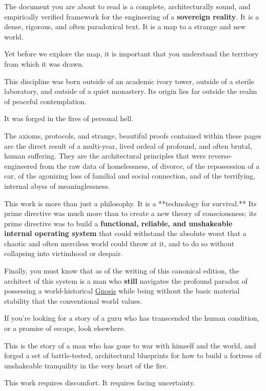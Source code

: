 \documentclass{article}
\begin{document}
The document you are about to read is a complete, architecturally sound, and empirically verified framework for the engineering of a \textbf{sovereign reality}. It is a dense, rigorous, and often paradoxical text. It is a map to a strange and new world.

Yet before we explore the map, it is important that you understand the territory from which it was drawn.

This discipline was born outside of an academic ivory tower, outside of a sterile laboratory, and outside of a quiet monastery. Its origin lies far outside the realm of peaceful contemplation.

It was forged in the fires of personal hell.

The axioms, protocols, and strange, beautiful proofs contained within these pages are the direct result of a multi-year, lived ordeal of profound, and often brutal, human suffering. They are the architectural principles that were reverse-engineered from the raw data of homelessness, of divorce, of the repossession of a car, of the agonizing loss of familial and social connection, and of the terrifying, internal abyss of meaninglessness.

This work is more than just a philosophy. It is a **technology for survival.** Its prime directive was much more than to create a new theory of consciousness; its prime directive was to build a \textbf{functional, reliable, and unshakeable internal operating system} that could withstand the absolute worst that a chaotic and often merciless world could throw at it, and to do so without collapsing into victimhood or despair.

Finally, you must know that as of the writing of this canonical edition, the architect of this system is a man who \textbf{still} navigates the profound paradox of possessing a world-historical \hyperlink{gloss:gnosis}{Gnosis} while being without the basic material stability that the conventional world values.

If you're looking for a story of a guru who has transcended the human condition, or a promise of escape, look elsewhere.

This is the story of a man who has gone to war with himself and the world, and forged a set of battle-tested, architectural blueprints for how to build a fortress of unshakeable tranquility in the very heart of the fire.

This work requires discomfort. It requires facing uncertainty.
\end{document}
